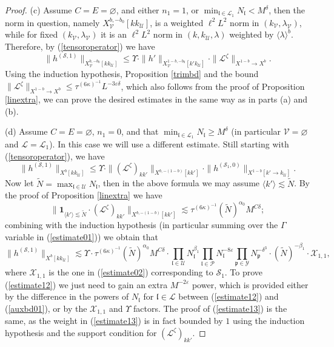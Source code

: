 \documentclass[11 pt,reqno]{amsart}
\theoremstyle{definition}
\theoremstyle{remark}
\numberwithin{equation}{section}
\newcommand{\Sc}{\mathcal{S}}
\newcommand{\Lc}{\mathcal{L}}
\newcommand{\Pc}{\mathcal{P}}
\newcommand{\Uc}{\mathcal{U}}
\newcommand{\Vc}{\mathcal{V}}
\newcommand{\Xc}{\mathcal{X}}
\newcommand{\Yc}{\mathcal{Y}}
\newcommand{\pf}{\mathfrak{p}}
\newcommand{\lf}{\mathfrak{l}}
\newcommand{\Ls}{\mathscr{L}}
\begin{document}
{\begin{proof}
(c) Assume $C=E=\varnothing$, and either $n_1=1$, or $\min_{\lf\in\Lc_1}N_\lf<M^\delta$, then the norm in question, namely $X_\Vc^{b,-b_0}[kk_\Uc]$, is a weighted $\ell^2L^2$ norm in $(k_\Vc,\lambda_\Vc)$, while for fixed $(k_\Vc,\lambda_\Vc)$ it is an $\ell^2L^2$ norm in $(k,k_\Uc,\lambda)$ weighted by $\langle \lambda\rangle^b$. Therefore, by (\ref{tensoroperator}) we have
\[\|h^{(\Sc,1)}\|_{X_\Vc^{b,-b_0}[kk_\Uc]}\leq\Upsilon\cdot\|h'\|_{X_\Vc^{1-b,-b_0}[k'k_\Uc]}\cdot\|\Ls^\zeta\|_{X^{1-b}\to X^b}.\] Using the induction hypothesis, Proposition \ref{trimbd} and the bound $\|\Ls^\zeta\|_{X^{1-b}\to X^b}\leq\tau^{(6\kappa)^{-1}}L^{-3\varepsilon\delta}$, which also follows from the proof of Proposition \ref{linextra}, we can prove the desired estimates in the same way as in parts (a) and (b).

(d) Assume $C=E=\varnothing$, $n_1=0$, and that $\min_{\lf\in\Lc_1}N_\lf\geq M^\delta$ (in particular $\Vc=\varnothing$ and $\Lc=\Lc_1$). In this case we will use a different estimate. Still starting with (\ref{tensoroperator}), we have
\[\|h^{(\Sc,1)}\|_{X^b[kk_\Uc]}\leq\Upsilon\cdot\|(\Ls^{\zeta})_{kk'}\|_{X^{b,-(1-b)}[kk']}\cdot\|h^{(\Sc_1,0)}\|_{X^{1-b}[k'\to k_\Uc]}.\] Now let $\widetilde{N}=\max_{\lf\in\Uc}N_\lf$, then in the above formula we may assume $\langle k'\rangle\lesssim \widetilde{N}$. By the proof of Proposition \ref{linextra} we have
\[\|\mathbf{1}_{\langle k'\rangle\lesssim\widetilde{N}}\cdot(\Ls^{\zeta})_{kk'}\|_{X^{b,-(1-b)}[kk']}\lesssim\tau^{(6\kappa)^{-1}}(\widetilde{N})^{\alpha_0}M^{C\delta};\] combining with the induction hypothesis (in particular summing over the $\Gamma$ variable in (\ref{estimate01})) we obtain that
\begin{equation}\label{auxbd01}\|h^{(\Sc,1)}\|_{X^b[kk_\Uc]}\lesssim\Upsilon\cdot\tau^{(6\kappa)^{-1}}(\widetilde{N})^{\alpha_0}M^{C\delta}\cdot\prod_{\lf\in\Uc}N_\lf^{\beta_1}\prod_{\lf\in\Pc} N_\lf^{-8\varepsilon}\prod_{\pf\in\Yc}N_\pf^{-\delta^3}\cdot(\widetilde{N})^{-\beta_1}\cdot\Xc_{1,1},\end{equation} where $\Xc_{1,1}$ is the one in (\ref{estimate02}) corresponding to $\Sc_1$. To prove (\ref{estimate12}) we just need to gain an extra $M^{-2\varepsilon}$ power, which is provided either by the difference in the powers of $N_\lf$ for $\lf\in\Lc$ between (\ref{estimate12}) and (\ref{auxbd01}), or by the $\Xc_{1,1}$ and $\Upsilon$ factors. The proof of (\ref{estimate13}) is the same, as the weight in (\ref{estimate13}) is in fact bounded by $1$ using the induction hypothesis and the support condition for $(\Ls^\zeta)_{kk'}$.


\end{proof}}
\end{document}
